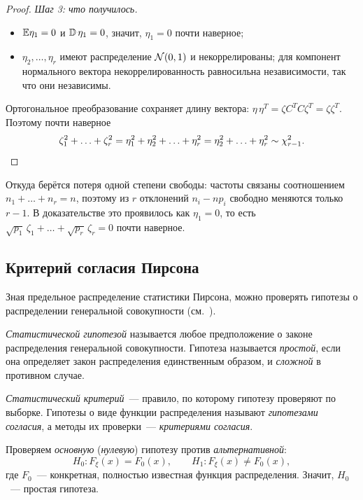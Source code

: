 \begin{proof}
  \emph{Шаг 3: что получилось.}
  \begin{itemize}
    \item $\mathbb{E}\eta_1 = 0$ и $\operatorname{\mathbb{D}}\eta_1 = 0$, значит, $\eta_1 = 0$ почти наверное;
    \item $\eta_2, \ldots, \eta_r$ имеют распределение $\mathcal{N}(0, 1)$ и некоррелированы;
          для компонент нормального вектора некоррелированность равносильна
          независимости, так что они независимы.
  \end{itemize}
  Ортогональное преобразование сохраняет длину вектора:
  $\eta\, \eta^T = \zeta C^T C \zeta^T = \zeta \zeta^T$. Поэтому почти наверное
  \[
    \zeta_1^2 + \ldots + \zeta_r^2 = \eta_1^2 + \eta_2^2 + \ldots + \eta_r^2
    = \eta_2^2 + \ldots + \eta_r^2 \sim \chi^2_{r-1}. \qedhere
  \]
\end{proof}

\begin{remark}
  Откуда берётся потеря одной степени свободы: частоты связаны соотношением
  $n_1 + \ldots + n_r = n$, поэтому из $r$ отклонений $n_i - n p_i$ свободно меняются
  только $r - 1$. В доказательстве это проявилось как $\eta_1 = 0$, то есть
  $\sqrt{p_1}\, \zeta_1 + \ldots + \sqrt{p_r}\, \zeta_r = 0$ почти наверное.
\end{remark}

\subsection{Критерий согласия Пирсона}
\label{lec04:pearson-test}

Зная предельное распределение статистики Пирсона, можно проверять гипотезы
о распределении генеральной совокупности (см.~\cite[гл.~14, §1]{bure}).

\begin{definition}
  \emph{Статистической гипотезой} называется любое предположение о законе распределения
  генеральной совокупности. Гипотеза называется \emph{простой}, если она определяет закон
  распределения единственным образом, и \emph{сложной} в противном случае.
\end{definition}

\emph{Статистический критерий}~--- правило, по которому гипотезу проверяют по выборке.
Гипотезы о виде функции распределения называют \emph{гипотезами согласия}, а методы
их проверки~--- \emph{критериями согласия}.

Проверяем \emph{основную} (\emph{нулевую}) гипотезу против \emph{альтернативной}:
\[
  H_0\colon F_\xi(x) = F_0(x), \qquad H_1\colon F_\xi(x) \ne F_0(x),
\]
где $F_0$~--- конкретная, полностью известная функция распределения. Значит, $H_0$~---
простая гипотеза.

